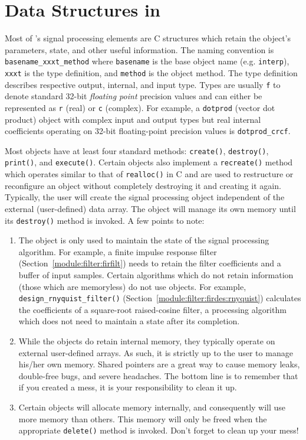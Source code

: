 %
%
\section{Data Structures in \liquid}
\label{section:data_structures}
Most of \liquid's signal processing elements are C structures which
retain the object's parameters, state, and other useful information.
The naming convention is
{\tt basename\_xxxt\_method} where
{\tt basename} is the base object name (e.g. {\tt interp}),
{\tt xxxt} is the type definition, and
{\tt method} is the object method.
The type definition describes respective output, internal, and input type.
Types are usually {\tt f} to denote standard 32-bit {\it floating point}
precision values and can either be represented as {\tt r} (real) or {\tt c}
(complex).
For example, a {\tt dotprod} (vector dot product) object with complex input
and output types but real internal coefficients operating on 32-bit
floating-point precision values is {\tt dotprod\_crcf}.

Most objects have at least four standard methods:
{\tt create()},
{\tt destroy()},
{\tt print()},
and
{\tt execute()}.
Certain objects also implement a {\tt recreate()} method which operates
similar to that of {\tt realloc()} in C and are used to restructure or
reconfigure an object without completely destroying it and creating it again.
Typically, the user will create the signal processing object independent of
the external (user-defined) data array.
The object will manage its own memory until its {\tt destroy()} method is
invoked.
A few points to note:
\begin{enumerate}
\item The object is only used to maintain the state of the signal processing
      algorithm.
      For example, a finite impulse response filter
      (Section~\ref{module:filter:firfilt}) needs to retain the filter
      coefficients and a buffer of input samples.
      Certain algorithms which do not retain information (those which are
      memoryless) do not use objects.
      For example, {\tt design\_rnyquist\_filter()}
      (Section~\ref{module:filter:firdes:rnyquist})
      calculates the coefficients of a square-root raised-cosine filter,
      a processing algorithm which does not need to maintain a state
      after its completion.
\item While the objects do retain internal memory, they typically operate on
      external user-defined arrays.
      As such, it is strictly up to the user to manage his/her own
      memory.
      Shared pointers are a great way to cause memory leaks, double-free
      bugs, and severe headaches.
      The bottom line is to remember that if you created a mess, it is
      your responsibility to clean it up.
\item Certain objects will allocate memory internally, and consequently
      will use more memory than others.
      This memory will only be freed when the appropriate {\tt delete()}
      method is invoked.
      Don't forget to clean up your mess!
\end{enumerate}


